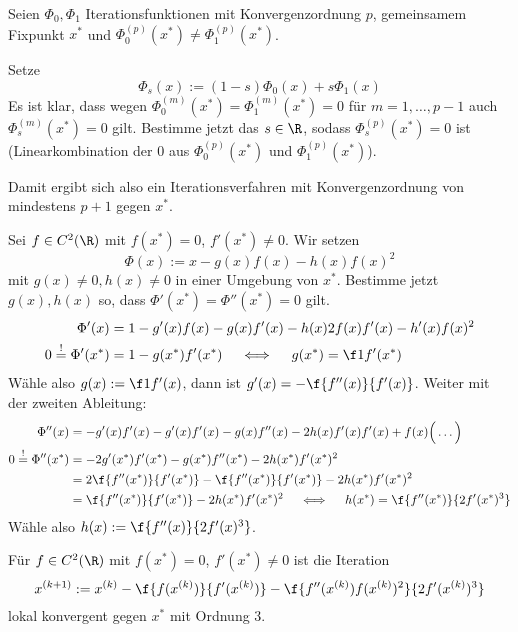 \documentclass[11pt]{scrbook}
\begin{document}
\begin{seg}
	Seien $\Phi_0, \Phi_1$ Iterationsfunktionen mit Konvergenzordnung $p$, gemeinsamem Fixpunkt $x^*$ und $\Phi_0^{(p)}(x^*) \neq \Phi_1^{(p)}(x^*)$.

	Setze
	\[
		\Phi_s(x) := (1-s)\Phi_0(x) + s\Phi_1(x)
	\]
	Es ist klar, dass wegen $\Phi_0^{(m)}(x^*) = \Phi_1^{(m)}(x^*) = 0$ für $m=1,\dotsc,p-1$ auch $\Phi_s^{(m)}(x^*) = 0$ gilt.
	Bestimme jetzt das $s\in \R$, sodass $\Phi_s^{(p)}(x^*) = 0$ ist (Linearkombination der $0$ aus $\Phi_0^{(p)}(x^*)$ und $\Phi_1^{(p)}(x^*)$).

	Damit ergibt sich also ein Iterationsverfahren mit Konvergenzordnung von mindestens $p+1$ gegen $x^*$.
\end{seg}
\begin{seg}
	Sei $f\in C^2(\R)$ mit $f(x^*) = 0$, $f'(x^*) \neq 0$.
	Wir setzen
	\[
		\Phi(x) := x - g(x) f(x) - h(x) f(x)^2
	\]
	mit $g(x) \neq 0, h(x) \neq 0$ in einer Umgebung von $x^*$.
	Bestimme jetzt $g(x),h(x)$ so, dass $\Phi'(x^*) = \Phi''(x^*) = 0$ gilt.
	\begin{align*}
		\Phi'(x) &= 1 - g'(x)f(x) - g(x)f'(x) - h(x)2f(x)f'(x) -h'(x)f(x)^2 \\
		0 \stackrel != \Phi'(x^*) &= 1 -g(x^*)f'(x^*) \quad\iff\quad g(x^*) = \f 1{f'(x^*)}
	\end{align*}
	Wähle also $g(x) := \f 1{f'(x)}$, dann ist $g'(x) = - \f {f''(x)}{f'(x)}$.
	Weiter mit der zweiten Ableitung:
	\begin{align*}
		\Phi''(x) &= -g'(x)f'(x) -g'(x)f'(x) - g(x)f''(x) - 2h(x)f'(x)f'(x) + f(x)\Big( \dotso \Big) \\
		0 \stackrel != \Phi''(x^*) &= -2g'(x^*)f'(x^*) -g(x^*)f''(x^*) - 2h(x^*)f'(x^*)^2 \\
		&= 2 \f {f''(x^*)}{f'(x^*)} - \f {f''(x^*)}{f'(x^*)} - 2h(x^*) f'(x^*)^2 \\
		&= \f {f''(x^*)}{f'(x^*)} - 2h(x^*) f'(x^*)^2 
		\quad\iff\quad h(x^*) = \f {f''(x^*)}{2f'(x^*)^3}
	\end{align*}
	Wähle also $h(x) := \f {f''(x)}{2f'(x)^3}$.
\end{seg}

\begin{kor} \label{3.13}
	Für $f\in C^2(\R)$ mit $f(x^*)=0$, $f'(x^*) \neq 0$ ist die Iteration
	\[
		x^{(k+1)} := x^{(k)} - \f {f(x^{(k)})}{f'(x^{(k)})} - \f {f''(x^{(k)})f(x^{(k)})^2}{2f'(x^{(k)})^3}
	\]
	lokal konvergent gegen $x^*$ mit Ordnung $3$.
\end{kor}
\end{document}
